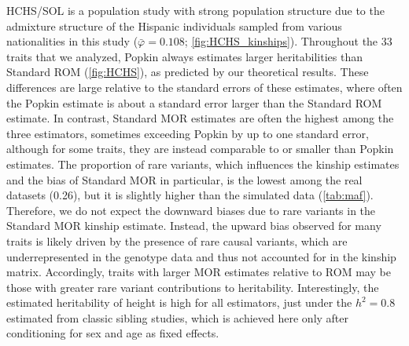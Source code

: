 \documentclass[11pt]{article}
\begin{document}

HCHS/SOL is a population study with strong population structure due to the admixture structure of the Hispanic individuals sampled from various nationalities in this study ($\bar{\varphi} = 0.108$; \cref{fig:HCHS_kinships}).
Throughout the 33 traits that we analyzed, Popkin always estimates larger heritabilities than Standard ROM (\cref{fig:HCHS}), as predicted by our theoretical results.
These differences are large relative to the standard errors of these estimates, where often the Popkin estimate is about a standard error larger than the Standard ROM estimate.
In contrast, Standard MOR estimates are often the highest among the three estimators, sometimes exceeding Popkin by up to one standard error, although for some traits, they are instead comparable to or smaller than Popkin estimates. 
The proportion of rare variants, which influences the kinship estimates and the bias of Standard MOR in particular, is the lowest among the real datasets (0.26), but it is slightly higher than the simulated data (\cref{tab:maf}).
Therefore, we do not expect the downward biases due to rare variants in the Standard MOR kinship estimate.
Instead, the upward bias observed for many traits is likely driven by the presence of rare causal variants, which are underrepresented in the genotype data and thus not accounted for in the kinship matrix. 
Accordingly, traits with larger MOR estimates relative to ROM may be those with greater rare variant contributions to heritability.
Interestingly, the estimated heritability of height is high for all estimators, just under the $h^2=0.8$ estimated from classic sibling studies, which is achieved here only after conditioning for sex and age as fixed effects.
\end{document}
